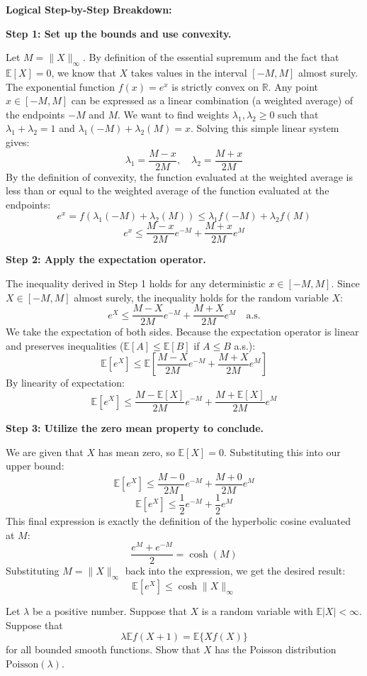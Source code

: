 \begin{solution}
\textbf{Logical Step-by-Step Breakdown:}

\textbf{Step 1: Set up the bounds and use convexity.}

Let $M = \|X\|_\infty$. By definition of the essential supremum and the fact that $\mathbb{E}[X] = 0$, we know that $X$ takes values in the interval $[-M, M]$ almost surely.
The exponential function $f(x) = e^x$ is strictly convex on $\mathbb{R}$.
Any point $x \in [-M, M]$ can be expressed as a linear combination (a weighted average) of the endpoints $-M$ and $M$.
We want to find weights $\lambda_1, \lambda_2 \geq 0$ such that $\lambda_1 + \lambda_2 = 1$ and $\lambda_1(-M) + \lambda_2(M) = x$.
Solving this simple linear system gives:
\[ \lambda_1 = \frac{M-x}{2M}, \quad \lambda_2 = \frac{M+x}{2M} \]
By the definition of convexity, the function evaluated at the weighted average is less than or equal to the weighted average of the function evaluated at the endpoints:
\[ e^x = f(\lambda_1(-M) + \lambda_2(M)) \leq \lambda_1 f(-M) + \lambda_2 f(M) \]
\[ e^x \leq \frac{M-x}{2M} e^{-M} + \frac{M+x}{2M} e^M \]

\textbf{Step 2: Apply the expectation operator.}

The inequality derived in Step 1 holds for any deterministic $x \in [-M, M]$. Since $X \in [-M, M]$ almost surely, the inequality holds for the random variable $X$:
\[ e^X \leq \frac{M-X}{2M} e^{-M} + \frac{M+X}{2M} e^M \quad \text{a.s.} \]
We take the expectation of both sides. Because the expectation operator is linear and preserves inequalities ($\mathbb{E}[A] \leq \mathbb{E}[B]$ if $A \leq B$ a.s.):
\[ \mathbb{E}[e^X] \leq \mathbb{E} \left[ \frac{M-X}{2M} e^{-M} + \frac{M+X}{2M} e^M \right] \]
By linearity of expectation:
\[ \mathbb{E}[e^X] \leq \frac{M - \mathbb{E}[X]}{2M} e^{-M} + \frac{M + \mathbb{E}[X]}{2M} e^M \]

\textbf{Step 3: Utilize the zero mean property to conclude.}

We are given that $X$ has mean zero, so $\mathbb{E}[X] = 0$. Substituting this into our upper bound:
\[ \mathbb{E}[e^X] \leq \frac{M - 0}{2M} e^{-M} + \frac{M + 0}{2M} e^M \]
\[ \mathbb{E}[e^X] \leq \frac{1}{2} e^{-M} + \frac{1}{2} e^M \]
This final expression is exactly the definition of the hyperbolic cosine evaluated at $M$:
\[ \frac{e^M + e^{-M}}{2} = \cosh(M) \]
Substituting $M = \|X\|_\infty$ back into the expression, we get the desired result:
\[ \mathbb{E}[e^X] \leq \cosh\|X\|_\infty \]
\end{solution}

\begin{exercise}\label{probability:2020:2}
Let $\lambda$ be a positive number. Suppose that $X$ is a random variable with $\mathbb{E}|X| < \infty$. Suppose that
\[
\lambda\mathbb{E}f(X+1) = \mathbb{E}\{Xf(X)\}
\]
for all bounded smooth functions. Show that $X$ has the Poisson distribution $\mathrm{Poisson}(\lambda)$.
\end{exercise}

